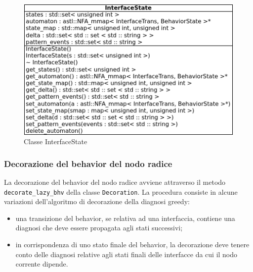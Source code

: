 \begin{figure}[htbp]
\centering
\includegraphics[scale=0.6]{./Img/implementazione/int_state.png}
\caption{Classe InterfaceState}
\label{fig:int_state}
\end{figure}

\subsubsection{Decorazione del behavior del nodo radice}
La decorazione del behavior del nodo radice avviene attraverso il metodo \verb|decorate_lazy_bhv| della classe \verb|Decoration|. La procedura consiste in alcune variazioni dell'algoritmo di decorazione della diagnosi greedy:
\begin{itemize}
\item una transizione del behavior, se relativa ad una interfaccia, contiene una diagnosi che deve essere propagata agli stati successivi;
\item in corrispondenza di uno stato finale del behavior, la decorazione deve tenere conto delle diagnosi relative agli stati finali delle interfacce da cui il nodo corrente dipende.
\end{itemize}
